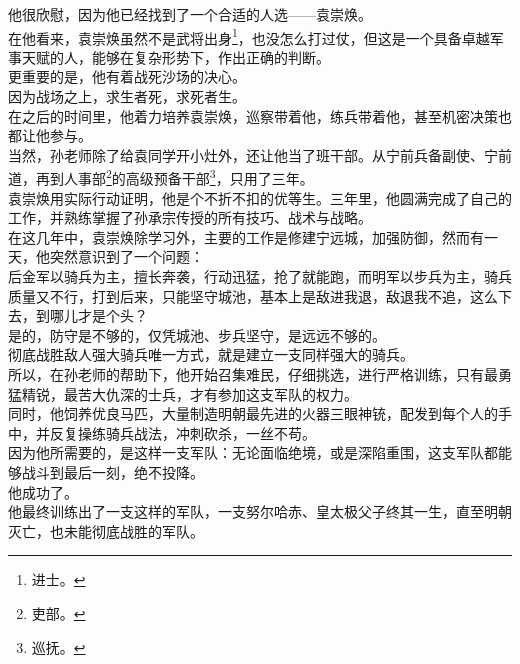 \begin{multicols}{\theparacolNo}
他很欣慰，因为他已经找到了一个合适的人选——袁崇焕。\\

在他看来，袁崇焕虽然不是武将出身\footnote{进士。}，也没怎么打过仗，但这是一个具备卓越军事天赋的人，能够在复杂形势下，作出正确的判断。\\

更重要的是，他有着战死沙场的决心。\\

因为战场之上，求生者死，求死者生。\\

在之后的时间里，他着力培养袁崇焕，巡察带着他，练兵带着他，甚至机密决策也都让他参与。\\

当然，孙老师除了给袁同学开小灶外，还让他当了班干部。从宁前兵备副使、宁前道，再到人事部\footnote{吏部。}的高级预备干部\footnote{巡抚。}，只用了三年。\\

袁崇焕用实际行动证明，他是个不折不扣的优等生。三年里，他圆满完成了自己的工作，并熟练掌握了孙承宗传授的所有技巧、战术与战略。\\

在这几年中，袁崇焕除学习外，主要的工作是修建宁远城，加强防御，然而有一天，他突然意识到了一个问题：\\

后金军以骑兵为主，擅长奔袭，行动迅猛，抢了就能跑，而明军以步兵为主，骑兵质量又不行，打到后来，只能坚守城池，基本上是敌进我退，敌退我不追，这么下去，到哪儿才是个头？\\

是的，防守是不够的，仅凭城池、步兵坚守，是远远不够的。\\

彻底战胜敌人强大骑兵唯一方式，就是建立一支同样强大的骑兵。\\

所以，在孙老师的帮助下，他开始召集难民，仔细挑选，进行严格训练，只有最勇猛精锐，最苦大仇深的士兵，才有参加这支军队的权力。\\

同时，他饲养优良马匹，大量制造明朝最先进的火器三眼神铳，配发到每个人的手中，并反复操练骑兵战法，冲刺砍杀，一丝不苟。\\

因为他所需要的，是这样一支军队：无论面临绝境，或是深陷重围，这支军队都能够战斗到最后一刻，绝不投降。\\

他成功了。\\

他最终训练出了一支这样的军队，一支努尔哈赤、皇太极父子终其一生，直至明朝灭亡，也未能彻底战胜的军队。\\


\end{multicols}
